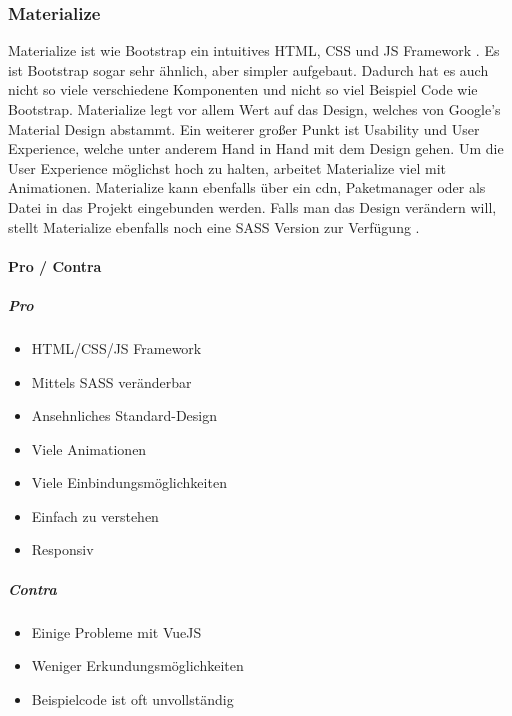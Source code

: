 		\subsubsection{Materialize}
		\label{chapter:study-frontend-frameworks-materialize}
		Materialize ist wie Bootstrap ein intuitives HTML, CSS und JS Framework \cite{materialize-intro}. Es ist Bootstrap sogar sehr ähnlich, aber simpler aufgebaut. Dadurch hat es auch nicht so viele verschiedene Komponenten und nicht so viel Beispiel Code wie Bootstrap. Materialize legt vor allem Wert auf das Design, welches von Google's Material Design abstammt. Ein weiterer großer Punkt ist Usability und User Experience, welche unter anderem Hand in Hand mit dem Design gehen. Um die User Experience möglichst hoch zu halten, arbeitet Materialize viel mit Animationen. Materialize kann ebenfalls über ein \Gls{cdn}, Paketmanager oder als Datei in das Projekt eingebunden werden. Falls man das Design verändern will, stellt Materialize ebenfalls noch eine SASS Version zur Verfügung \cite{WebDocMaterialize}.
		\paragraph{Pro / Contra}
		\subparagraph{Pro}
		\begin{itemize}
			\item HTML/CSS/JS Framework
			\item Mittels SASS veränderbar
			\item Ansehnliches Standard-Design 
			\item Viele Animationen
			\item Viele Einbindungsmöglichkeiten
			\item Einfach zu verstehen
			\item Responsiv
		\end{itemize}
	\label{list:materializepro}
		\subparagraph{Contra}
		\begin{itemize}
			\item Einige Probleme mit VueJS
			\item Weniger Erkundungsmöglichkeiten
			\item Beispielcode ist oft unvollständig
		\end{itemize}
	\label{list:materializecontra}
	
